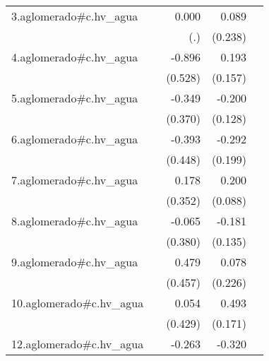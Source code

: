 {\begin{longtable}{l*{4}{D{.}{.}{-1}}}
\addlinespace
3.aglomerado#c.hv\_agua&                     &       0.000         &       0.089         &                     \\
            &                     &         (.)         &     (0.238)         &                     \\
\addlinespace
4.aglomerado#c.hv\_agua&                     &      -0.896         &       0.193         &                     \\
            &                     &     (0.528)         &     (0.157)         &                     \\
\addlinespace
5.aglomerado#c.hv\_agua&                     &      -0.349         &      -0.200         &                     \\
            &                     &     (0.370)         &     (0.128)         &                     \\
\addlinespace
6.aglomerado#c.hv\_agua&                     &      -0.393         &      -0.292         &                     \\
            &                     &     (0.448)         &     (0.199)         &                     \\
\addlinespace
7.aglomerado#c.hv\_agua&                     &       0.178         &       0.200\sym{*}  &                     \\
            &                     &     (0.352)         &     (0.088)         &                     \\
\addlinespace
8.aglomerado#c.hv\_agua&                     &      -0.065         &      -0.181         &                     \\
            &                     &     (0.380)         &     (0.135)         &                     \\
\addlinespace
9.aglomerado#c.hv\_agua&                     &       0.479         &       0.078         &                     \\
            &                     &     (0.457)         &     (0.226)         &                     \\
\addlinespace
10.aglomerado#c.hv\_agua&                     &       0.054         &       0.493\sym{**} &                     \\
            &                     &     (0.429)         &     (0.171)         &                     \\
\addlinespace
12.aglomerado#c.hv\_agua&                     &      -0.263         &      -0.320         &                     \\

\end{longtable}}

